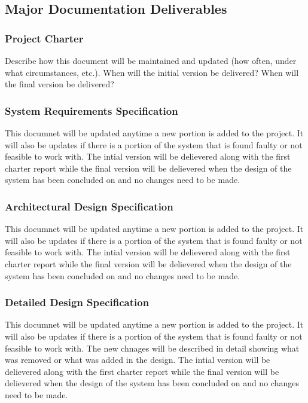 
\subsection{Major Documentation Deliverables}

\subsubsection{Project Charter}
Describe how this document will be maintained and updated (how often, under what circumstances, etc.). When will the initial version be delivered? When will the final version be delivered?

\subsubsection{System Requirements Specification}
This documnet will be updated anytime a new portion is added to the project. It will also be updates if there is a portion of the system that is found faulty or not feasible to work with. The intial version will be delievered along with the first charter report while the final version will be delievered when the design of the system has been concluded on and no changes need to be made.

\subsubsection{Architectural Design Specification}
This documnet will be updated anytime a new portion is added to the project. It will also be updates if there is a portion of the system that is found faulty or not feasible to work with. The intial version will be delievered along with the first charter report while the final version will be delievered when the design of the system has been concluded on and no changes need to be made.

\subsubsection{Detailed Design Specification}
This documnet will be updated anytime a new portion is added to the project. It will also be updates if there is a portion of the system that is found faulty or not feasible to work with. The new chnages will be described in detail showing what was removed or what was added in the design. The intial version will be delievered along with the first charter report while the final version will be delievered when the design of the system has been concluded on and no changes need to be made.

